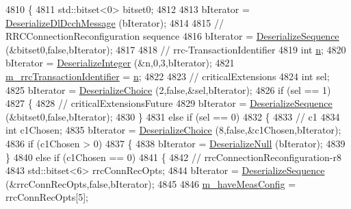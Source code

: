 \begin{DoxyCode}
4810 \{
4811   std::bitset<0> bitset0;
4812 
4813   bIterator = \hyperlink{classns3_1_1RrcDlDcchMessage_afa8618901d8be7727b6a579a246055b2}{DeserializeDlDcchMessage} (bIterator);
4814 
4815   \textcolor{comment}{// RRCConnectionReconfiguration sequence}
4816   bIterator = \hyperlink{classns3_1_1Asn1Header_a58c68bb97ba3fe2e8fcdd7c208d672b2}{DeserializeSequence} (&bitset0,\textcolor{keyword}{false},bIterator);
4817 
4818   \textcolor{comment}{// rrc-TransactionIdentifier}
4819   \textcolor{keywordtype}{int} \hyperlink{namespacesample-rng-plot_aeb5ee5c431e338ef39b7ac5431242e1d}{n};
4820   bIterator = \hyperlink{classns3_1_1Asn1Header_a49802c9af30018b078150e866b6ecae2}{DeserializeInteger} (&n,0,3,bIterator);
4821   \hyperlink{classns3_1_1RrcConnectionReconfigurationHeader_ae6f276694b1b97f017227127d196cd2a}{m\_rrcTransactionIdentifier} = \hyperlink{namespacesample-rng-plot_aeb5ee5c431e338ef39b7ac5431242e1d}{n};
4822 
4823   \textcolor{comment}{// criticalExtensions}
4824   \textcolor{keywordtype}{int} sel;
4825   bIterator = \hyperlink{classns3_1_1Asn1Header_a0af5881f07a0549a8693a1b75c229a90}{DeserializeChoice} (2,\textcolor{keyword}{false},&sel,bIterator);
4826   \textcolor{keywordflow}{if} (sel == 1)
4827     \{
4828       \textcolor{comment}{// criticalExtensionsFuture}
4829       bIterator = \hyperlink{classns3_1_1Asn1Header_a58c68bb97ba3fe2e8fcdd7c208d672b2}{DeserializeSequence} (&bitset0,\textcolor{keyword}{false},bIterator);
4830     \}
4831   \textcolor{keywordflow}{else} \textcolor{keywordflow}{if} (sel == 0)
4832     \{
4833       \textcolor{comment}{// c1}
4834       \textcolor{keywordtype}{int} c1Chosen;
4835       bIterator = \hyperlink{classns3_1_1Asn1Header_a0af5881f07a0549a8693a1b75c229a90}{DeserializeChoice} (8,\textcolor{keyword}{false},&c1Chosen,bIterator);
4836       \textcolor{keywordflow}{if} (c1Chosen > 0)
4837         \{
4838           bIterator = \hyperlink{classns3_1_1Asn1Header_a29bd4508f3f1ef636b3480f524fac0ce}{DeserializeNull} (bIterator);
4839         \}
4840       \textcolor{keywordflow}{else} \textcolor{keywordflow}{if} (c1Chosen == 0)
4841         \{
4842           \textcolor{comment}{// rrcConnectionReconfiguration-r8}
4843           std::bitset<6> rrcConnRecOpts;
4844           bIterator = \hyperlink{classns3_1_1Asn1Header_a58c68bb97ba3fe2e8fcdd7c208d672b2}{DeserializeSequence} (&rrcConnRecOpts,\textcolor{keyword}{false},bIterator);
4845 
4846           \hyperlink{classns3_1_1RrcConnectionReconfigurationHeader_a274b29c01be85788f4857565cf9e05c5}{m\_haveMeasConfig} = rrcConnRecOpts[5];

\end{DoxyCode}
